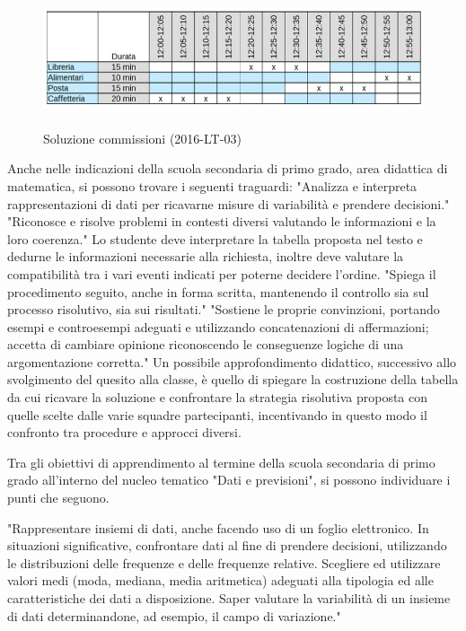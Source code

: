 \documentclass[12pt]{report}
\begin{document}
\begin{figure}[H]
	\centering
	\includegraphics[height=4.0cm]{corrispondenze2.jpeg}
	\caption{Soluzione commissioni (2016-LT-03)}\label{fig:5}
\end{figure}

Anche nelle indicazioni della scuola secondaria di primo grado, area didattica di matematica, si possono trovare i seguenti traguardi:
"Analizza e interpreta rappresentazioni di dati per ricavarne misure di variabilità e prendere decisioni."
"Riconosce e risolve problemi in contesti diversi valutando le informazioni e la loro coerenza."
Lo studente deve interpretare la tabella proposta nel testo e dedurne le informazioni necessarie alla richiesta, inoltre deve valutare la compatibilità tra i vari eventi indicati per poterne decidere l'ordine.
"Spiega il procedimento seguito, anche in forma scritta, mantenendo il controllo sia sul processo risolutivo, sia sui risultati."
"Sostiene le proprie convinzioni, portando esempi e controesempi adeguati e utilizzando concatenazioni di affermazioni; accetta di cambiare opinione riconoscendo le conseguenze logiche di una argomentazione corretta."
Un possibile approfondimento didattico, successivo allo svolgimento del quesito alla classe, è quello di spiegare la costruzione della tabella da cui ricavare la soluzione e confrontare la strategia risolutiva proposta con quelle scelte dalle varie squadre partecipanti, incentivando in questo modo il confronto tra procedure e approcci diversi.

Tra gli obiettivi di apprendimento al termine della scuola secondaria di primo grado all'interno del nucleo tematico "Dati e previsioni", si possono individuare i punti che seguono.

"Rappresentare insiemi di dati, anche facendo uso di un foglio elettronico. In situazioni significative, confrontare dati al fine di prendere decisioni, utilizzando le distribuzioni delle frequenze e delle frequenze relative. Scegliere ed utilizzare valori medi (moda, mediana, media aritmetica) adeguati alla tipologia ed alle caratteristiche dei dati a disposizione. Saper valutare la variabilità di un insieme di dati determinandone, ad esempio, il campo di variazione."
\end{document}
